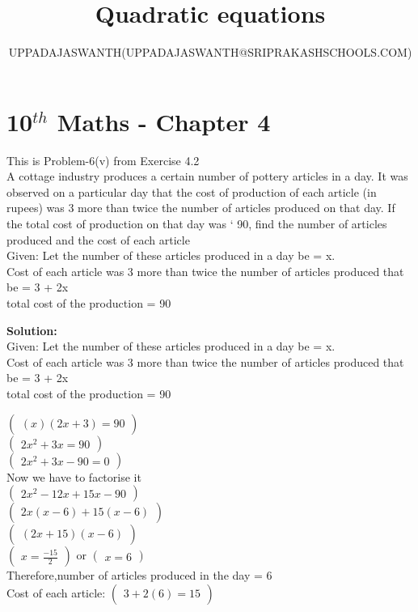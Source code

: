 \documentclass[12pt]{article}
\title{Quadratic equations}
\author{UPPADAJASWANTH(UPPADAJASWANTH@SRIPRAKASHSCHOOLS.COM)}
\newcommand{\myvec}[1]{\ensuremath{\begin{pmatrix}#1\end{pmatrix}}}
\newcommand{\solution}{\noindent \textbf{Solution: }}
\begin{document}
\section*{10$^{th}$ Maths - Chapter 4}
This is Problem-6(v) from Exercise 4.2\\
A cottage industry produces a certain number of pottery articles in a day. It was observed
on a particular day that the cost of production of each article (in rupees) was 3 more than
twice the number of articles produced on that day. If the total cost of production on that
day was ` 90, find the number of articles produced and the cost of each article\\
Given:
Let the number of these articles produced in a day be = x.\\
Cost of each article was 3 more than twice the number of articles
produced that be = 3 + 2x\\
total cost of the production = 90

\solution\\
Given:
Let the number of these articles produced in a day be = x.\\
Cost of each article was 3 more than twice the number of articles
produced that be = 3 + 2x\\
total cost of the production = 90

\myvec{(x)(2x + 3) = 90}\\
\myvec{2x^2+3x=90}\\
\myvec{2x^2+3x-90=0}\\
Now we have to factorise it\\
\myvec{2x^2-12x+15x-90}\\
\myvec{2x(x-6)+15(x-6)}\\
\myvec{(2x+15)(x-6)}\\
\myvec{x=\frac{-15}{2}}
or
\myvec{x=6}\\
Therefore,number of articles produced in the day = 6\\
Cost of each article:
\myvec{3+2(6)=15}
\end{document}
